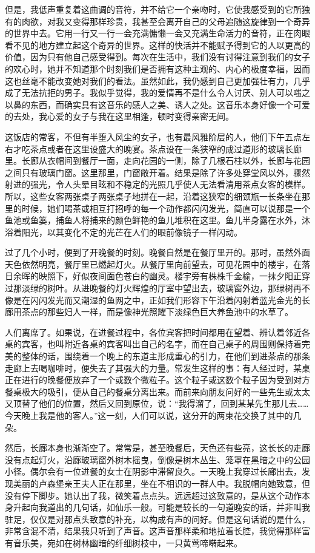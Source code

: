 \par 但是，我低声重复着这曲调的音符，并不给它一个亲吻时，它使我感受到的它所独有的肉欲，对我又变得那样珍贵，我甚至会离开自己的父母追随这旋律到一个奇异的世界中去。它用一行又一行一会充满慵懒一会又充满生命活力的音符，正在肉眼看不见的地方建立起这个奇异的世界。这样的快活并不能赋予得到它的人以更高的价值，因为只有他自己感受得到。每次在生活中，我们没有讨得注意到我们的女子的欢心时，她并不知道那个时刻我们是否拥有这种主观的、内心的极度幸福，因而这也丝毫不能改变她对我们的看法。虽然如此，我仍感到自己更加强壮有力，几乎成了无法抗拒的男子。我似乎觉得，我的爱情再不是什么令人讨厌、别人可以嗤之以鼻的东西，而确实具有这音乐的感人之美、诱人之处。这音乐本身好像一个可爱的去处，我心爱的女子与我在这里相逢，顿时变得亲密无间。
\par 这饭店的常客，不但有半堕入风尘的女子，也有最风雅阶层的人，他们下午五点左右才吃茶点或者在这里设盛大的晚宴。茶点设在一条狭窄的成过道形的玻璃长廊里。长廊从衣帽间到餐厅一面，走向花园的一侧，除了几根石柱以外，长廊与花园之间只有玻璃门窗。这里那里，门窗敞开着。结果是除了许多处穿堂风以外，骤然射进的强光，令人头晕目眩和不稳定的光照几乎使人无法看清用茶点女客的模样。所以，这些女客两张桌子两张桌子地拼在一起，沿着这狭窄的细颈瓶一长条坐在那里的时候，她们喝茶或相互打招呼的每一个动作都闪闪发光，简直可以说那是一个鱼池或鱼篓，捕鱼人将捕来的颜色鲜艳的鱼儿堆积在这里。鱼儿半身露在水外，沐浴着阳光，以其变化不定的光芒在人们的眼前像镜子一样闪动。
\par 过了几个小时，便到了开晚餐的时刻。晚餐自然是在餐厅里开的。那时，虽然外面天色依然明亮，餐厅里已燃起灯火。从餐厅里向前望去，可见花园中的楼宇，在落日余晖的映照下，好似夜间面色苍白的幽灵。楼宇旁有株株千金榆，一抹夕阳正穿过那淡绿的树叶。从进晚餐的灯火辉煌的厅室中望出去，玻璃窗外边，那绿树再不像是在闪闪发光而又潮湿的鱼网之中，正如我们形容下午沿着闪射着蓝光金光的长廊用茶点的那些妇人一样，而是像神光照耀下淡绿色巨大养鱼池中的水草了。
\par 人们离席了。如果说，在进餐过程中，各位宾客把时间都用在望着、辨认着邻近各桌的宾客，也叫附近各桌的宾客叫出自己的名字，而在自己桌子的周围则保持着完美的整体的话，围绕着一个晚上的东道主形成重心的引力，在他们到进茶点的那条走廊上去喝咖啡时，便失去了其强大的力量。常发生这样的事：有人经过时，某桌正在进行的晚餐便放弃了一个或数个微粒子。这个粒子或这数个粒子因为受到对方餐桌极大的吸引，便从自己的餐桌分离出来。而前来向朋友问好的一些先生或太太又顶替了他们的位置，然后又回到原位，说：“我得溜了，回到某某先生那儿去……今天晚上我是他的客人。”这一刻，人们可以说，这分开的两束花交换了其中的几朵。
\par 然后，长廊本身也渐渐空了。常常是，甚至晚餐后，天色还有些亮，这长长的走廊没有点起灯火，沿廊玻璃窗外树木摇曳，倒像是树木丛生、笼罩在黑暗之中的公园小径。偶尔会有一位进餐的女士在阴影中滞留良久。一天晚上我穿过长廊出去，发现美丽的卢森堡亲王夫人正在那里，坐在不相识的一群人中。我脱帽向她致意，但没有停下脚步。她认出了我，微笑着点点头。远远超过这致意的，是从这个动作本身升起向我道出的几句话，如仙乐一般。可能是较长的一句道晚安的话，并非叫我驻足，仅仅是对那点头致意的补充，以构成有声的问好。但是这句话说的是什么，非常含混不清，结果我只听到了声音。这声音那样柔和地拉着长腔，我觉得那样富有音乐美，宛如在树林幽暗的纤细树枝中，一只黄莺啼啭起来。
